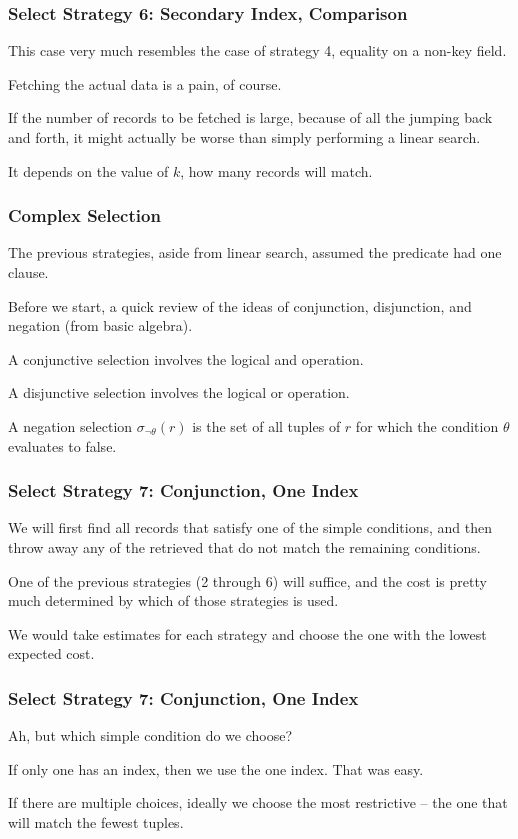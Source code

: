 \begin{frame}
\frametitle{Select Strategy 6: Secondary Index, Comparison}

This case very much resembles the case of strategy 4, equality on a non-key field. 

Fetching the actual data is a pain, of course. 

If the number of records to be fetched is large, because of all the jumping back and forth, it might actually be worse than simply performing a linear search.  

It depends on the value of $k$, how many records will match. 

\end{frame}


\begin{frame}
\frametitle{Complex Selection}

The previous strategies, aside from linear search, assumed the predicate had one clause. 

Before we start, a quick review of the ideas of conjunction, disjunction, and negation (from basic algebra).

A conjunctive selection involves the logical and operation.

A disjunctive selection involves the logical or operation. 

A negation selection $\sigma_{\neg \theta}(r)$ is the set of all tuples of $r$ for which the condition $\theta$ evaluates to false. 

\end{frame}

\begin{frame}
\frametitle{Select Strategy 7: Conjunction, One Index}
We will first find all records that satisfy one of the simple conditions, and then throw away any of the retrieved that do not match the remaining conditions. 

One of the previous strategies (2 through 6) will suffice, and the cost is pretty much determined by which of those strategies is used. 

We would take estimates for each strategy and choose the one with the lowest expected cost.

\end{frame}



\begin{frame}
\frametitle{Select Strategy 7: Conjunction, One Index}
Ah, but which simple condition do we choose? 

If only one has an index, then we use the one index. That was easy. 

If there are multiple choices, ideally we choose the most restrictive -- the one that will match the fewest tuples. 

\end{frame}



